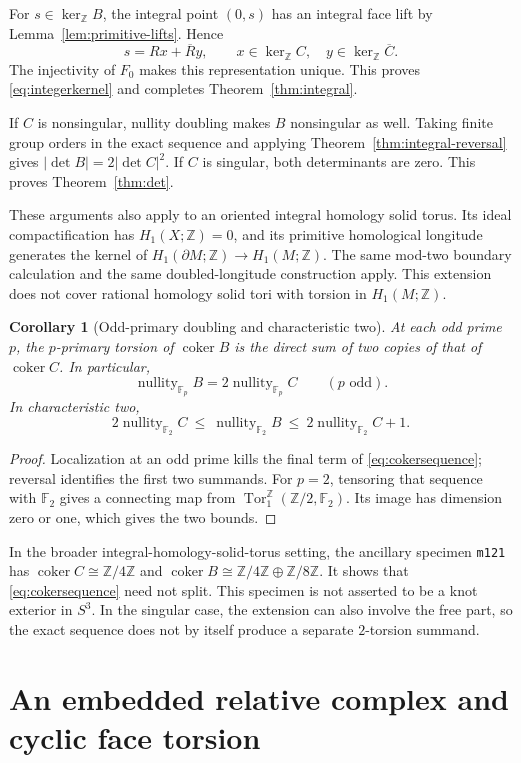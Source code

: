 \documentclass[11pt]{article}
\newtheorem{corollary}[theorem]{Corollary}
\theoremstyle{definition}\newtheorem{definition}[theorem]{Definition}
\theoremstyle{remark}\newtheorem{remark}[theorem]{Remark}
\DeclareMathOperator{\nullity}{nullity}
\DeclareMathOperator{\coker}{coker}
\newcommand{\Z}{\mathbb Z}
\newcommand{\Ct}{\overline C}
\newcommand{\Rt}{\overline R}
\begin{document}
For $s\in\ker_{\Z}B$, the integral point $(0,s)$ has an integral face
lift by Lemma~\ref{lem:primitive-lifts}. Hence
\[
 s=Rx+\Rt y,\qquad x\in\ker_{\Z}C,\quad
 y\in\ker_{\Z}\Ct.
\]
The injectivity of $F_0$ makes this representation unique. This proves
\eqref{eq:integerkernel} and completes Theorem~\ref{thm:integral}.

If $C$ is nonsingular, nullity doubling makes $B$ nonsingular as well.
Taking finite group orders in the exact sequence and applying
Theorem~\ref{thm:integral-reversal} gives
$|\det B|=2|\det C|^2$. If $C$ is singular, both determinants are zero.
This proves Theorem~\ref{thm:det}.

These arguments also apply to an oriented integral homology solid torus.
Its ideal compactification has $H_1(X;\Z)=0$, and its primitive
homological longitude generates the kernel of
$H_1(\partial M;\Z)\to H_1(M;\Z)$. The same mod-two boundary
calculation and the same doubled-longitude construction apply. This
extension does not cover rational homology solid tori with torsion in
$H_1(M;\Z)$.

\begin{corollary}[Odd-primary doubling and characteristic two]
\label{cor:primes}
At each odd prime $p$, the $p$-primary torsion of $\coker B$ is the
direct sum of two copies of that of $\coker C$. In particular,
\[
 \nullity_{\mathbb F_p}B=2\nullity_{\mathbb F_p}C
 \qquad(p\text{ odd}).
\]
In characteristic two,
\[
 2\nullity_{\mathbb F_2}C
 \ \leq\ \nullity_{\mathbb F_2}B
 \ \leq\ 2\nullity_{\mathbb F_2}C+1.
\]
\end{corollary}
\begin{proof}
Localization at an odd prime kills the final term of
\eqref{eq:cokersequence}; reversal identifies the first two summands.
For $p=2$, tensoring that sequence with $\mathbb F_2$ gives a connecting
map from $\operatorname{Tor}_1^{\Z}(\Z/2,\mathbb F_2)$. Its image
has dimension zero or one, which gives the two bounds.
\end{proof}

In the broader integral-homology-solid-torus setting, the ancillary
specimen \texttt{m121} has $\coker C\cong\Z/4\Z$ and
$\coker B\cong\Z/4\Z\oplus\Z/8\Z$. It shows that
\eqref{eq:cokersequence} need not split. This specimen is not asserted
to be a knot exterior in $S^3$. In the singular case, the extension can
also involve the free part, so the exact sequence does not by itself
produce a separate $2$-torsion summand.

\section{An embedded relative complex and cyclic face torsion}
\label{sec:embedded}
\end{document}
